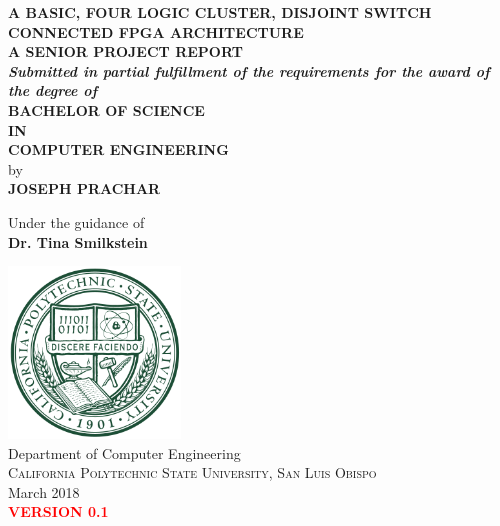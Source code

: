\documentclass[12pt]{article}
\renewcommand{\baselinestretch}{1.5}
\begin{document}
\begin{titlepage}

\begin{center}

\renewcommand{\baselinestretch}{1.5}
\Large \textbf { A BASIC, FOUR LOGIC CLUSTER, DISJOINT SWITCH CONNECTED FPGA ARCHITECTURE }\\[0.8in]

\normalsize
\textbf{ A SENIOR PROJECT REPORT}\\[0.1in]
 \small
       \textit{\textbf{Submitted in partial fulfillment of
        the requirements for the award of the degree of}}\\[0.3in]
\normalsize
       \textbf{ BACHELOR OF SCIENCE \\IN\\ COMPUTER ENGINEERING}\\[0.5in]

 by \\
\textbf{ JOSEPH PRACHAR }

\vspace{.3in}
Under the guidance of\\
{\textbf{ Dr. Tina Smilkstein }}\\[0.1in]

\vfill

\includegraphics[height=1.8in]{logo}\\[0.1in]
{Department of Computer Engineering}\\
\normalsize
\textsc{ California Polytechnic State University, San Luis Obispo }\\
March 2018\\
\textcolor{red}{\textbf{VERSION 0.1}}


\end{center}

\end{titlepage}
\end{document}
